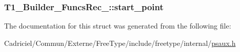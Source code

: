 \hypertarget{struct_t1___builder___funcs_rec___ab4897186c65875b4312d4ef68aad9d02}{
\subsubsection[{start\-\_\-point}]{ T1\-\_\-\-Builder\-\_\-\-Funcs\-Rec\-\_\-\-::start\-\_\-point}}\label{struct_t1___builder___funcs_rec___ab4897186c65875b4312d4ef68aad9d02}


The documentation for this struct was generated from the following file\-:\begin{DoxyCompactItemize}
\item 
Cadriciel/\-Commun/\-Externe/\-Free\-Type/include/freetype/internal/\hyperlink{psaux_8h}{psaux.\-h}\end{DoxyCompactItemize}
